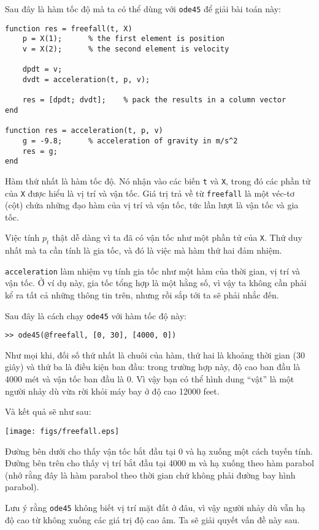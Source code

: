 \documentclass[12pt]{book}
\begin{document}
Sau đây là hàm tốc độ mà ta có thể dùng với {\tt ode45} để giải
bài toán này:

\begin{verbatim}
function res = freefall(t, X)
    p = X(1);      % the first element is position
    v = X(2);      % the second element is velocity

    dpdt = v;                          
    dvdt = acceleration(t, p, v);

    res = [dpdt; dvdt];    % pack the results in a column vector
end

function res = acceleration(t, p, v)
    g = -9.8;      % acceleration of gravity in m/s^2
    res = g;
end
\end{verbatim}
%
Hàm thứ nhất là hàm tốc độ. Nó nhận vào các biến {\tt t} và
{\tt X}, trong đó các phần tử của {\tt X} được hiểu là vị trí
và vận tốc. Giá trị trả về từ {\tt freefall} là một véc-tơ (cột)
chứa những đạo hàm của vị trí và vận tốc, tức lần lượt là
vận tốc và gia tốc.

Việc tính $p_t$ thật dễ dàng vì ta đã có vận tốc như một
phần tử của {\tt X}. Thứ duy nhất mà ta cần tính là gia tốc,
và đó là việc mà hàm thứ hai đảm nhiệm.

{\tt acceleration} làm nhiệm vụ tính gia tốc như một hàm của
thời gian, vị trí và vận tốc. Ở ví dụ này, gia tốc tổng hợp là một
hằng số, vì vậy ta không cần phải kể ra tất cả những thông tin
trên, nhưng rồi sắp tới ta sẽ phải nhắc đến.

Sau đây là cách chạy {\tt ode45} với hàm tốc độ này:

\begin{verbatim}
>> ode45(@freefall, [0, 30], [4000, 0])
\end{verbatim}
%
Như mọi khi, đối số thứ nhất là chuôi của hàm, thứ hai là khoảng
thời gian (30 giây) và thứ ba là điều kiện ban đầu: trong trường
hợp này, độ cao ban đầu là 4000 mét và vận tốc ban đầu là 0.
Vì vậy bạn có thể hình dung ``vật'' là một người nhảy dù vừa
rời khỏi máy bay ở độ cao 12000 feet.

Và kết quả sẽ như sau:

\centerline{\texttt{[image: figs/freefall.eps]}}

Đường bên dưới cho thấy vận tốc bắt đầu tại 0 và hạ xuống
một cách tuyến tính. Đường bên trên cho thấy vị trí bắt đầu
tại 4000 m và hạ xuống theo hàm parabol (nhớ rằng đây là
hàm parabol theo thời gian chứ không phải đường bay hình
parabol).

Lưu ý rằng {\tt ode45} không biết vị trí mặt đất ở đâu, vì vậy
người nhảy dù vẫn hạ độ cao từ không xuống các giá trị độ cao
âm. Ta sẽ giải quyết vấn đề này sau.
\end{document}
